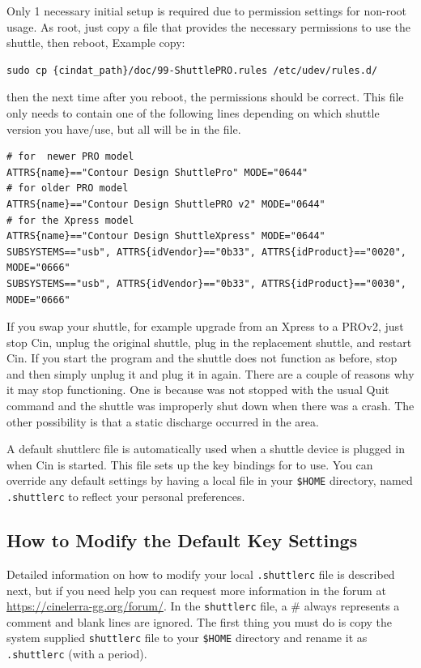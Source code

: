 Only 1 necessary initial setup is required due to permission
settings for non-root usage. As root, just copy a file that provides
the necessary permissions to use the shuttle, then reboot, Example
copy:

\begin{lstlisting}[style=sh]
sudo cp {cindat_path}/doc/99-ShuttlePRO.rules /etc/udev/rules.d/
\end{lstlisting}

then the next time after you reboot, the permissions should be
correct. This file only needs to contain one of the following lines
depending on which shuttle version you have/use, but all will be in
the file.

\begin{lstlisting}[style=sh]
# for  newer PRO model
ATTRS{name}=="Contour Design ShuttlePro" MODE="0644"
# for older PRO model
ATTRS{name}=="Contour Design ShuttlePRO v2" MODE="0644"
# for the Xpress model
ATTRS{name}=="Contour Design ShuttleXpress" MODE="0644"
SUBSYSTEMS=="usb", ATTRS{idVendor}=="0b33", ATTRS{idProduct}=="0020", MODE="0666"
SUBSYSTEMS=="usb", ATTRS{idVendor}=="0b33", ATTRS{idProduct}=="0030", MODE="0666"
\end{lstlisting}

If you swap your shuttle, for example upgrade from an Xpress to a
PROv2, just stop Cin, unplug the original shuttle, plug in the
replacement shuttle, and restart Cin.  If you start the \CGG{}
program and the shuttle does not function as before, stop \CGG{} and
then simply unplug it and plug it in again.  There are a couple of
reasons why it may stop functioning.  One is because \CGG{} was not
stopped with the usual Quit command and the shuttle was improperly
shut down when there was a crash.  The other possibility is that a
static discharge occurred in the area.

A default shuttlerc file is automatically used when a shuttle device
is plugged in when Cin is started. This file sets up the key
bindings for \CGG{} to use. You can override any default settings by
having a local file in your \texttt{\$HOME} directory, named
\texttt{.shuttlerc} to reflect your personal preferences.


\subsection{How to Modify the Default Key Settings}%
\label{sub:modify_default_key_settings}

Detailed information on how to modify your local \texttt{.shuttlerc}
file is described next, but if you need help you can request more
information in the forum at {\small 
  \url{https://cinelerra-gg.org/forum/}}. In the \texttt{shuttlerc} file, a
\# always represents a comment and blank lines are ignored.  The
first thing you must do is copy the system supplied
\texttt{shuttlerc} file to your \texttt{\$HOME} directory and rename
it as \texttt{.shuttlerc} (with a period).

